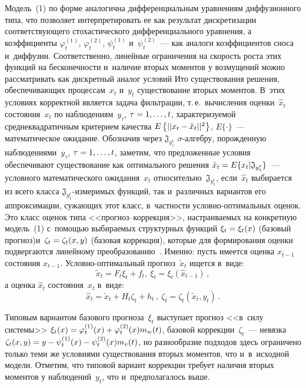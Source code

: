 \begin{multicols}{2}
    Модель~(1) по форме аналогична диффе\-рен\-циальным уравнениям 
диффузионного типа, что позволяет интерпретировать ее как результат 
дискретизации соответствующего стохастического дифференциального 
уравнения, а коэффициенты $\varphi_t^{(1)}$, $\varphi_t^{(2)}$, $\psi_t^{(1)}$ 
и~$\psi_t^{(2)}$~--- как аналоги коэффициентов сноса и~диффузии. 
Соответственно, линейные ограничения на скорость роста этих функций на 
бесконечности и~наличие вторых моментов у возмущений можно 
рассматривать как дискретный аналог условий Ито существования решения, 
обеспечивающих процессам~$x_t$ и~$y_t$ существование вторых моментов. 
В~этих условиях корректной является задача фильтрации, т.\,е.\ вычисления 
оценки~$\hat{x}_t$ состояния~$x_t$ по наблюдениям~$y_\tau$, 
$\tau\hm=1,\ldots , t$, характеризуемой среднеквадратичным критерием качества 
$E\left\{ \vert\vert x_t\hm- \hat{x}_t\vert\vert^2\right\}$, $E\{\cdot\}$~--- 
математическое ожидание.  Обозначив через $\mathfrak{J}_{y_1^{t}}$ 
$\sigma$-ал\-геб\-ру, порожденную наблюдениями~$y_\tau$, $\tau\hm=1,\ldots 
,t$, заметим, что предложенные условия обеспечивают существование как 
оптимального решения $\hat{x}_t\hm= E\{ x_t\vert \mathfrak{J}_{y_1^t}\}$~--- 
условного математического ожидания~$x_t$ 
относительно~$\mathfrak{J}_{y_1^t}$, если~$\hat{x}_t$ выбирается из всего 
класса $\mathfrak{J}_{y_1^t}$-из\-ме\-ри\-мых функций, так и~различных 
вариантов его аппроксимации, сужающих этот класс, в~частности  
услов\-но-оп\-ти\-маль\-ных оценок. Это класс оценок типа\linebreak 
 <<про\-гноз--кор\-рек\-ция>>, настраиваемых на конкретную модель~(1) 
с~помощью выбираемых структурных функций $\xi_t\hm=\xi_t(x)$ (базовый 
прогноз)\linebreak и~$\zeta_t\hm=\zeta_t(x,y)$ (базовая коррекция), которые для 
формирования оценки подвергаются линейному  
преобразованию~\cite{3-bos, 4-bos}. Именно: пусть имеется оценка 
 $\hat{x}_{t-1}$ состояния $x_{t-1}$. Услов\-но-оп\-ти\-маль\-ный 
прогноз~$\tilde{x}_t$ ищется в~виде:
    \begin{equation}
    \tilde{x}_t=F_t\xi_t+f_t,\ \xi_t=\xi_t\left( \hat{x}_{t-1}\right)\,,
    \label{e2-bos}
    \end{equation}
    а оценка $\hat{x}_t$ состояния~$x_t$ в~виде:
    \begin{equation}
    \hat{x}_t=\tilde{x}_t+H_t\zeta_t +h_t\,,\ \zeta_t=\zeta_t\left( \tilde{x}_t, 
y_t\right)\,.
    \label{e3-bos}
\end{equation}
    
    Типовым вариантом базового прогноза~$\xi_t$ выступает прогноз 
<<в~силу системы>> $\xi_t(x)\hm= \varphi_t^{(1)}(x)\hm+ \varphi_t^{(2)}(x) 
m_w(t)$, базовой коррекции~$\zeta_t$~--- невязка $\zeta_t(x,y)\hm= y\hm- 
\psi_t^{(1)}(x)\hm- \psi_t^{(2)}(x) m_v(t)$, но разнообразие подходов здесь 
ограничено только теми же условиями существования вторых моментов, что 
и~в~исходной модели. Отметим, что типовой вариант коррекции требует 
наличия вторых моментов у наблюдений~$y_t$, что и~предполагалось выше.
    

\end{multicols}
